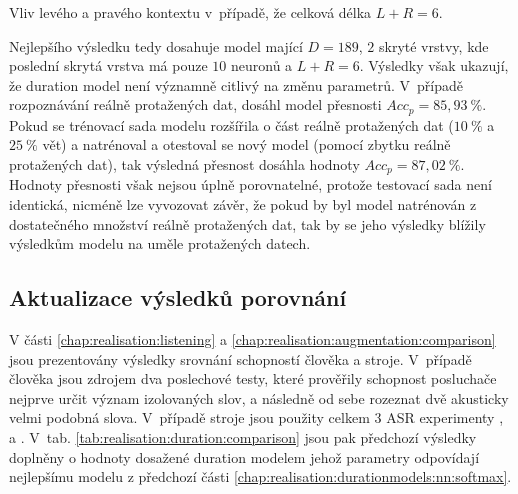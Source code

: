 \begin{table}[htpb]
  \centering
  \def\arraystretch{1.5}
  \caption{Vliv levého a pravého kontextu v~případě, že celková délka $L + R = 6$.}
  \label{tab:realisation:duration:context:asymetric}
\end{table}

Nejlepšího výsledku tedy dosahuje model mající $D = 189$, $2$ skryté vrstvy, kde poslední skrytá vrstva má pouze $10$ neuronů a $L + R = 6$. Výsledky však ukazují, že duration model není významně citlivý na změnu parametrů. V~případě rozpoznávání reálně protažených dat, dosáhl model přesnosti $Acc_{p} = 85,93\ \%$. Pokud se trénovací sada modelu rozšířila o část reálně protažených dat ($10\ \%$ a $25\ \%$ vět) a natrénoval a otestoval se nový model (pomocí zbytku reálně protažených dat), tak výsledná přesnost dosáhla hodnoty $Acc_{p} = 87,02\ \%$. Hodnoty přesnosti však nejsou úplně porovnatelné, protože testovací sada není identická, nicméně lze vyvozovat závěr, že pokud by byl model natrénován z dostatečného množství reálně protažených dat, tak by se jeho výsledky blížily výsledkům modelu na uměle protažených datech.


\subsection{Aktualizace výsledků porovnání}
\label{chap:realisation:duration:comparison}

V části \ref{chap:realisation:listening} a \ref{chap:realisation:augmentation:comparison} jsou prezentovány výsledky srovnání schopností člověka a stroje. V~případě člověka jsou zdrojem dva poslechové testy, které prověřily schopnost posluchače nejprve určit význam izolovaných slov, a následně od sebe rozeznat dvě akusticky velmi podobná slova. V~případě stroje jsou použity celkem $3$ ASR experimenty ,  a . V~tab. \ref{tab:realisation:duration:comparison} jsou pak předchozí výsledky doplněny o hodnoty dosažené duration modelem jehož parametry odpovídají nejlepšímu modelu z předchozí části \ref{chap:realisation:durationmodels:nn:softmax}.

